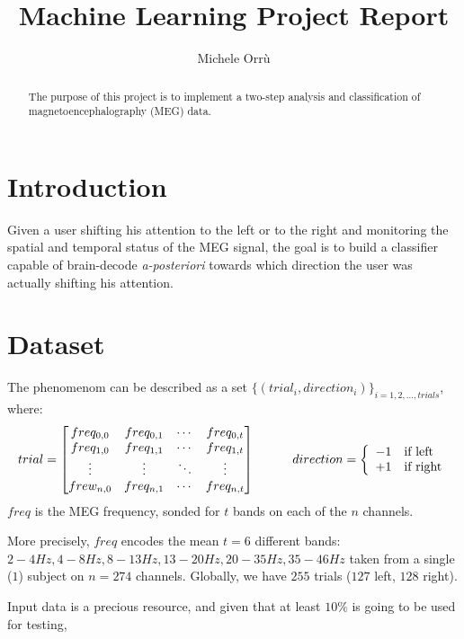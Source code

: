 \documentclass[10pt]{article}
\title{\textbf{Machine Learning Project Report }}
\author{Michele Orr\`u}
\begin{document}
\maketitle

\begin{abstract}
The purpose of this project is to implement a two-step analysis and classification of magnetoencephalography (MEG) data. 
\end{abstract}



\section{Introduction}
Given a user shifting his attention to the left or to the right and monitoring the spatial and temporal status of the MEG\cite{Biomag2010} signal, the goal is to build a classifier capable of brain-decode \textit{a-posteriori} towards which direction the user was actually shifting his attention.



\section{Dataset}
The phenomenom can be described as a set $\{(trial_i, direction_i)\}_{i= 1, 2, \dots, trials}$, where:
$$
trial  = 
 \begin{bmatrix}
   freq_{0, 0} & freq_{0, 1} & \cdots & freq_{0, t}  \\
   freq_{1, 0} & freq_{1, 1} & \cdots & freq_{1, t}  \\
   \vdots      & \vdots      & \ddots & \vdots       \\
   frew_{n, 0} & freq_{n, 1} & \cdots & freq_{n, t} 
 \end{bmatrix}
\hspace{30pt}
 direction = \left\{
 \begin{array}{l l}
   -1 & \text{if left}\\
   +1 & \text{if right}\\
 \end{array}\right .
$$
$freq$ is the MEG frequency, sonded for $t$ bands on each of the $n$ channels.

More precisely, $freq$ encodes the mean $t=6$ different bands:
$2-4Hz, 4-8Hz, 8-13Hz, 13-20Hz, 20-35Hz, 35-46Hz$ taken from a single ($1$) subject on $n=274$ channels. 
Globally, we have $255$ trials ($127$ left, $128$ right).  

Input data is a precious resource, and given that at least $10\%$ is going to be used for testing, 
\end{document}
